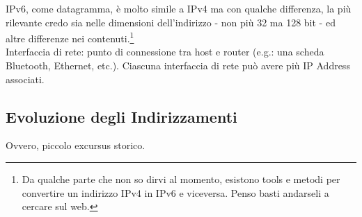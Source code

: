\noindent IPv6, come datagramma, è molto simile a IPv4 ma con qualche differenza, la più rilevante credo sia nelle dimensioni dell'indirizzo - non più 32 ma 128 bit - ed altre differenze nei contenuti.\footnote{Da qualche parte che non so dirvi al momento, esistono tools e metodi per convertire un indirizzo IPv4 in IPv6 e viceversa. Penso basti andarseli a cercare sul web.}\\

\noindent Interfaccia di rete: punto di connessione tra host e router (e.g.: una scheda Bluetooth, Ethernet, etc.). Ciascuna interfaccia di rete può avere più IP Address associati.\\

\subsection*{Evoluzione degli Indirizzamenti}
\noindent Ovvero, piccolo excursus storico.\\

